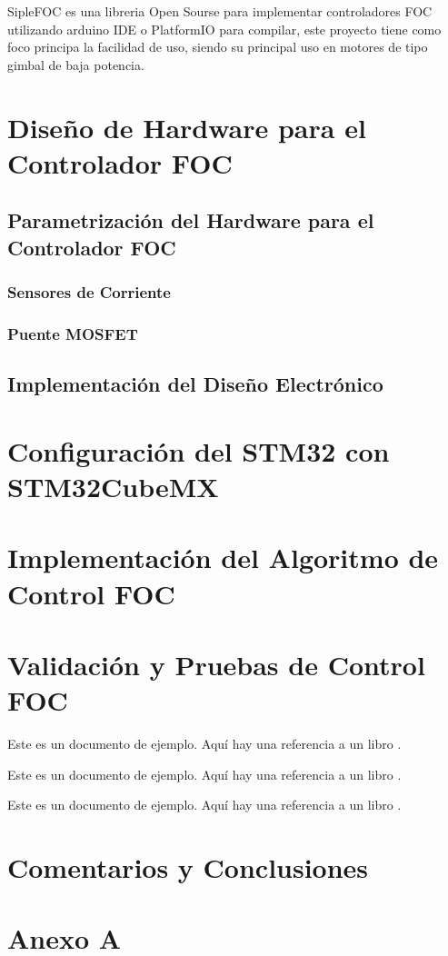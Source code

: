 \documentclass[11pt]{report}
\begin{document}
SipleFOC \cite{Skuric_SimpleFOC_A_Field_2022} es una libreria Open Sourse para implementar controladores FOC utilizando arduino IDE o PlatformIO para compilar, este proyecto tiene como foco principa la facilidad de uso, siendo su principal uso en motores de tipo gimbal de baja potencia.

\newpage
\chapter{Diseño de Hardware para el Controlador FOC}
\section{Parametrización del Hardware para el Controlador FOC}
\subsection{Sensores de Corriente}
\subsection{Puente MOSFET}
\section{Implementación del Diseño Electrónico}

\newpage
\chapter{Configuración del STM32 con STM32CubeMX}

\newpage
\chapter{Implementación del Algoritmo de Control FOC}

\newpage
\chapter{Validación y Pruebas de Control FOC}
Este es un documento de ejemplo. Aquí hay una referencia a un libro \cite{power_conv_00}.

Este es un documento de ejemplo. Aquí hay una referencia a un libro \cite{AN2757_00}.

Este es un documento de ejemplo. Aquí hay una referencia a un libro \cite{odrive_SVM}.

\newpage
\chapter*{Comentarios y Conclusiones}

\newpage
{}
\printbibliography

\newpage
{}

\chapter*{Anexo A}
\end{document}
